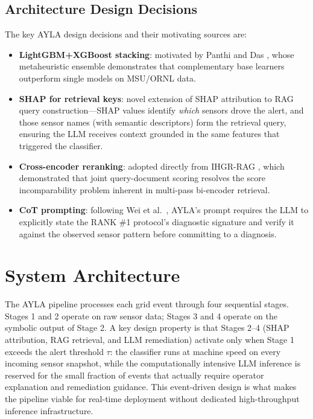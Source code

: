 \documentclass[twocolumn, 10pt, letterpaper]{article}
\begin{document}
\subsection{Architecture Design Decisions}

The key AYLA design decisions and their motivating sources are:

\begin{itemize}
    \item \textbf{LightGBM+XGBoost stacking}: motivated by Panthi and Das
          \cite{panthi2022ensemble}, whose metaheuristic ensemble demonstrates
          that complementary base learners outperform single models on MSU/ORNL data.
    \item \textbf{SHAP for retrieval keys}: novel extension of SHAP attribution to
          RAG query construction---SHAP values identify \textit{which} sensors drove
          the alert, and those sensor names (with semantic descriptors) form the
          retrieval query, ensuring the LLM receives context grounded in the
          same features that triggered the classifier.
    \item \textbf{Cross-encoder reranking}: adopted directly from
          IHGR-RAG \cite{ihgrrag2025}, which demonstrated that joint query-document
          scoring resolves the score incomparability problem inherent in
          multi-pass bi-encoder retrieval.
    \item \textbf{CoT prompting}: following Wei et al.\ \cite{wei2022cot},
          AYLA's prompt requires the LLM to explicitly state the RANK \#1
          protocol's diagnostic signature and verify it against the observed
          sensor pattern before committing to a diagnosis.
\end{itemize}

\section{System Architecture}
\label{sec:system}

The AYLA pipeline processes each grid event through four sequential stages.
Stages 1 and 2 operate on raw sensor data; Stages 3 and 4 operate on the symbolic
output of Stage 2.
A key design property is that Stages 2--4 (SHAP attribution, RAG retrieval, and
LLM remediation) activate only when Stage 1 exceeds the alert threshold $\tau$:
the classifier runs at machine speed on every incoming sensor snapshot, while the
computationally intensive LLM inference is reserved for the small fraction of
events that actually require operator explanation and remediation guidance.
This event-driven design is what makes the pipeline viable for real-time deployment
without dedicated high-throughput inference infrastructure.
\end{document}
